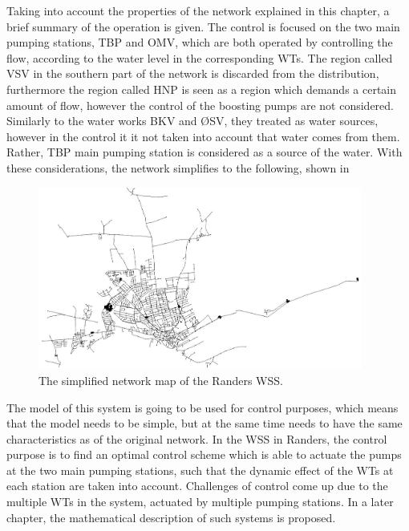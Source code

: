 Taking into account the properties of the network explained in this chapter, a brief summary of the operation is given. The control is focused on the two main pumping stations, TBP and OMV, which are both operated by controlling the flow, according to the water level in the corresponding WTs. The region called VSV in the southern part of the network is discarded from the distribution, furthermore the region called HNP is seen as a region which demands a certain amount of flow, however the control of the boosting pumps are not considered. Similarly to the water works BKV and ØSV, they treated as water sources, however in the control it it not taken into account that water comes from them. Rather, TBP main pumping station is considered as a source of the water. With these considerations, the network simplifies to the following, shown in 

\begin{figure}[H]
\centering
\includegraphics[width=0.95\textwidth]{report/pictures/verdo_pic2}
\caption{The simplified network map of the Randers WSS.}
\label{fig:simplified_network}
\end{figure}

\vspace{-3mm}
The model of this system is going to be used for control purposes, which means that the model needs to be simple, but at the same time needs to have the same characteristics as of the original network. In the WSS in Randers, the control purpose is to find an optimal control scheme which is able to actuate the pumps at the two main pumping stations, such that the dynamic effect of the WTs at each station are taken into account. Challenges of control come up due to the multiple WTs in the system, actuated by multiple pumping stations. In a later chapter, the mathematical description of such systems is proposed. 








